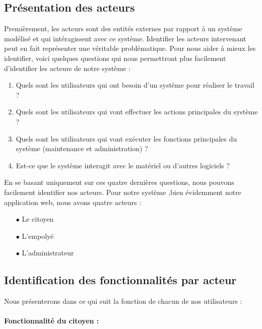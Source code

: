   \subsection{ Présentation des acteurs}
Premièrement, les acteurs sont des entités externes par rapport à un système modélisé et qui intéragissent avec ce système. Identifier les acteurs intervenant peut en fait représenter une véritable problématique. Pour nous aider à mieux les identifier, voici
quelques questions qui nous permettront plus facilement d'identifier les acteurs de notre système :
\vspace{0.2cm}
\begin{enumerate}
\item Quels sont les utilisateurs qui ont besoin d'un système pour réaliser le
travail ?

\item  Quels sont les utilisateurs qui vont effectuer les actions principales du
système ?

\item Quels sont les utilisateurs qui vont exécuter les fonctions principales
du système (maintenance et administration) ?

\item Est-ce que le système interagit avec le matériel ou d'autres logiciels ?
\vspace{0.2cm}
\end{enumerate}
En se basant uniquement sur ces quatre dernières questions, nous pouvons
facilement identifier nos acteurs.
Pour notre système ,bien évidemment notre application web, nous avons
quatre acteurs :\\
\begin{itemize}
\item[$\bullet$] Le citoyen\\
\item[$\bullet$] L'empolyé\\
\item[$\bullet$] L'administrateur
\end{itemize}

\newpage
 \subsection{ Identification des fonctionnalités par acteur}
 Nous présenterons dans ce qui suit la fonction de chacun de nos utilisateurs :\\\\
\large{\textbf{      Fonctionnalité du citoyen : }}
 \newpage
